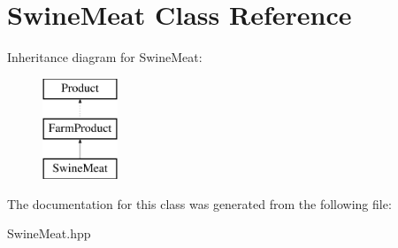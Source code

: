 \hypertarget{class_swine_meat}{}\section{Swine\+Meat Class Reference}
\label{class_swine_meat}
Inheritance diagram for Swine\+Meat\+:\begin{figure}[H]
\begin{center}
\leavevmode
\includegraphics[height=3.000000cm]{class_swine_meat}
\end{center}
\end{figure}


The documentation for this class was generated from the following file\+:\begin{DoxyCompactItemize}
\item 
Swine\+Meat.\+hpp\end{DoxyCompactItemize}
